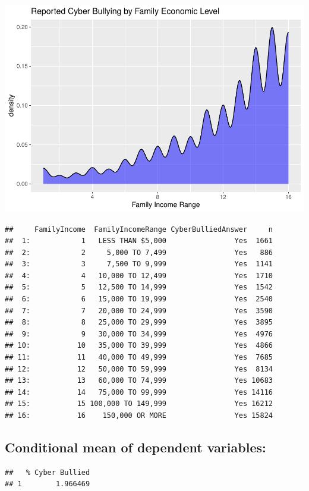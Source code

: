 \documentclass[
  man,LLO-8200, Introduction to Data Science]{apa6}
\begin{document}
\includegraphics{CyberBully_files/figure-latex/unnamed-chunk-2-1.pdf}

\begin{verbatim}
##     FamilyIncome  FamilyIncomeRange CyberBulliedAnswer     n
##  1:            1   LESS THAN $5,000                Yes  1661
##  2:            2     5,000 TO 7,499                Yes   886
##  3:            3     7,500 TO 9,999                Yes  1141
##  4:            4   10,000 TO 12,499                Yes  1710
##  5:            5   12,500 TO 14,999                Yes  1542
##  6:            6   15,000 TO 19,999                Yes  2540
##  7:            7   20,000 TO 24,999                Yes  3590
##  8:            8   25,000 TO 29,999                Yes  3895
##  9:            9   30,000 TO 34,999                Yes  4976
## 10:           10   35,000 TO 39,999                Yes  4866
## 11:           11   40,000 TO 49,999                Yes  7685
## 12:           12   50,000 TO 59,999                Yes  8134
## 13:           13   60,000 TO 74,999                Yes 10683
## 14:           14   75,000 TO 99,999                Yes 14116
## 15:           15 100,000 TO 149,999                Yes 16212
## 16:           16    150,000 OR MORE                Yes 15824
\end{verbatim}

\hypertarget{conditional-mean-of-dependent-variables}{%
\subsection{Conditional mean of dependent variables:}\label{conditional-mean-of-dependent-variables}}

\begin{verbatim}
##   % Cyber Bullied
## 1        1.966469
\end{verbatim}
\end{document}
